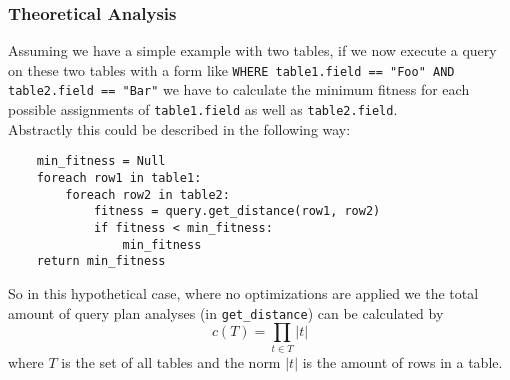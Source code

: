 \subsubsection{Theoretical Analysis}

Assuming we have a simple example with two tables, if we now execute a query on these two tables with a form like \verb|WHERE table1.field == "Foo" AND table2.field == "Bar"| we have to calculate the minimum fitness for each possible assignments of \verb|table1.field| as well as \verb|table2.field|.\\
Abstractly this could be described in the following way:
\begin{verbatim}
    min_fitness = Null
    foreach row1 in table1:
        foreach row2 in table2:
            fitness = query.get_distance(row1, row2)
            if fitness < min_fitness:
                min_fitness
    return min_fitness
\end{verbatim}
So in this hypothetical case, where no optimizations are applied we the total amount of query plan analyses (in \verb|get_distance|) can be calculated by
\begin{equation}
	\label{eqn:comparisons_for_fitness}
	c(T) = \prod_{t \in T} |t|
\end{equation}
where $T$ is the set of all tables and the norm $|t|$ is the amount of rows in a table.

